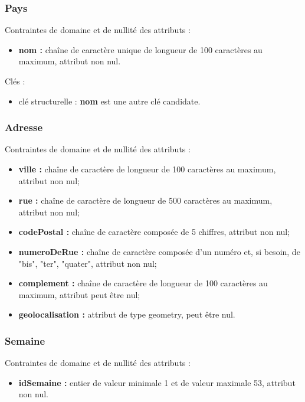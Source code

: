 \subsubsection*{Pays}
Contraintes de domaine et de nullité des attributs :
\begin{itemize}
	\item \textbf{nom :} chaîne de caractère unique de longueur de 100 caractères au maximum, attribut non nul. \\
\end{itemize}

Clés : 
\begin{itemize}
\item clé structurelle : \textbf{nom} est une autre clé candidate. \\ 
\end{itemize}


\subsubsection*{Adresse}
Contraintes de domaine et de nullité des attributs :
\begin{itemize}
 	\item \textbf{ville :} chaîne de caractère de longueur de 100 caractères au maximum, attribut non nul;
	\item \textbf{rue :} chaîne de caractère de longueur de 500 caractères au maximum, attribut non nul;
	\item \textbf{codePostal :} chaîne de caractère composée de 5 chiffres, attribut non nul;
	\item \textbf{numeroDeRue :} chaîne de caractère composée d'un numéro et, si besoin, de "bis", "ter", "quater", attribut non nul; 
	\item \textbf{complement : } chaîne de caractère de longueur de 100 caractères au maximum, attribut peut être nul;
	\item \textbf{geolocalisation : } attribut de type geometry, peut être nul.\\
\end{itemize}

\subsubsection*{Semaine}
Contraintes de domaine et de nullité des attributs : 
\begin{itemize}
	\item \textbf{idSemaine :} entier de valeur minimale 1 et de valeur maximale 53, attribut non nul.
\end{itemize}

